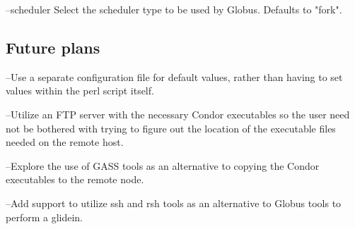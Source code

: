 --scheduler
	Select the scheduler type to be used by Globus. Defaults to "fork".

\subsection{Future plans}
--Use a separate configuration file for default values, rather than
having to set values within the perl script itself.

--Utilize an FTP server with the necessary Condor executables so the
user need not be bothered with trying to figure out the location of 
the executable files needed on the remote host.

--Explore the use of GASS tools as an alternative to copying the
Condor executables to the remote node.

--Add support to utilize ssh and rsh tools as an alternative to Globus
tools to perform a glidein.
